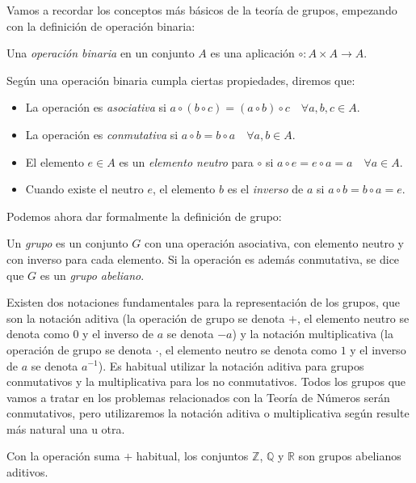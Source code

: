 Vamos a recordar los conceptos más básicos de la teoría de grupos,
empezando con la definición de operación binaria:

\begin{definition}
Una \textit{operación binaria} en un conjunto $A$ es una aplicación
$\circ : A\times A \rightarrow A$.
\end{definition}

Según una operación binaria cumpla ciertas propiedades, diremos que:

\begin{itemize}
	\item La operación es \textit{asociativa} si $a\circ (b\circ c) =
(a\circ b)\circ c \quad \forall a,b,c\in A$.
	\item La operación es \textit{conmutativa} si $a\circ b=b\circ a
\quad \forall a,b\in A$.
	\item El elemento $e\in A$ es un \textit{elemento neutro} para
$\circ $ si $a\circ e = e\circ a = a \quad \forall a\in A$.
	\item Cuando existe el neutro $e$, el elemento
$b$ es el \textit{inverso} de $a$ si $a\circ b=b\circ a=e$.
\end{itemize}

Podemos ahora dar formalmente la definición de grupo:

\begin{definition}
	Un \textit{grupo} es un conjunto $G$ con una operación asociativa,
con elemento neutro y con inverso para cada elemento. Si la operación es
además conmutativa, se dice que $G$ es un \textit{grupo abeliano}.
\end{definition}

Existen dos notaciones fundamentales para la representaci\'on de los grupos, que
son la notaci\'on aditiva (la operaci\'on de grupo se denota $+$, el elemento
neutro se denota como $0$ y el inverso de $a$ se denota $-a$) y la notaci\'on
multiplicativa (la operaci\'on de grupo se denota $\cdot$, el elemento neutro
se denota como $1$ y el inverso de $a$ se denota $a^{-1}$).
Es habitual utilizar la notaci\'on aditiva para grupos conmutativos y la
multiplicativa para los no conmutativos. Todos los grupos que vamos a tratar en
los problemas relacionados con la Teor\'ia de N\'umeros
ser\'an conmutativos, pero utilizaremos la notaci\'on
aditiva o multiplicativa seg\'un resulte m\'as natural una u otra.


Con la operación suma $+$ habitual, los conjuntos $\mathbb{Z}$, $\mathbb{Q}$ y
$\mathbb{R}$ son grupos abelianos aditivos.

